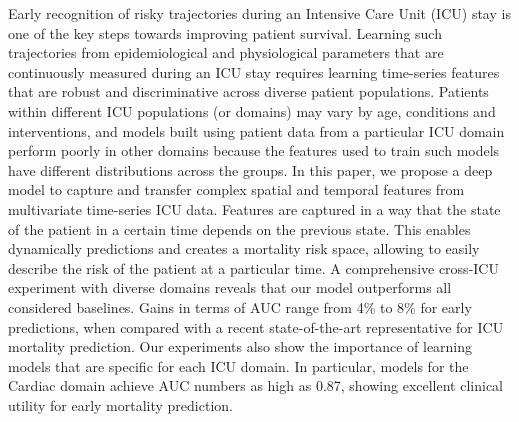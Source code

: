 Early recognition of risky trajectories during an Intensive Care Unit (ICU) stay is one of the key steps towards improving patient survival. Learning such trajectories from epidemiological and physiological parameters that are continuously measured during an ICU stay requires learning time-series features that are robust and discriminative across diverse patient populations. Patients within different ICU populations (or domains) may vary by age, conditions and interventions, and models built using patient data from a particular ICU domain perform poorly in other domains because the features used to train such models have different distributions across the groups. In this paper, we propose a deep model to capture and transfer complex spatial and temporal features from multivariate time-series ICU data. Features are captured in a way that the state of the patient in a certain time depends on the previous state. This enables dynamically predictions and creates a mortality risk space, allowing to easily describe the risk of the patient at a particular time.
A comprehensive cross-ICU experiment with diverse domains reveals that our model outperforms all considered baselines. Gains in terms of AUC range from 4\% to 8\% for early predictions, when compared with a recent state-of-the-art representative for ICU mortality prediction. Our experiments also show the importance of learning models that are specific for each ICU domain. In particular, models for the Cardiac domain achieve AUC numbers as high as 0.87, showing excellent clinical utility for early mortality prediction.

